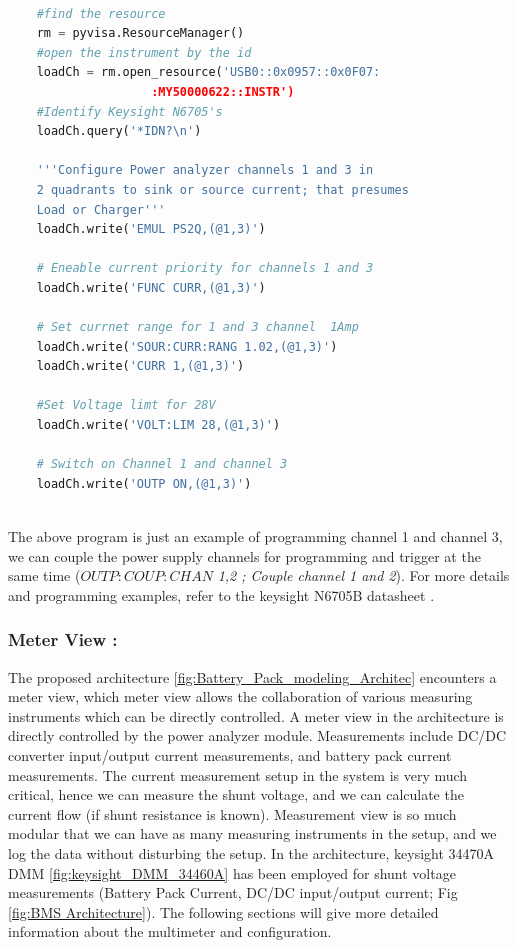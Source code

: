 \begin{lstlisting}[language=Python, caption=Load/Charger Configuration for Keysight N6705's]

    #find the resource
    rm = pyvisa.ResourceManager()
    #open the instrument by the id 
    loadCh = rm.open_resource('USB0::0x0957::0x0F07:
                    :MY50000622::INSTR')
    #Identify Keysight N6705's
    loadCh.query('*IDN?\n')
    
    '''Configure Power analyzer channels 1 and 3 in 
    2 quadrants to sink or source current; that presumes 
    Load or Charger'''
    loadCh.write('EMUL PS2Q,(@1,3)')

    # Eneable current priority for channels 1 and 3
    loadCh.write('FUNC CURR,(@1,3)')
    
    # Set currnet range for 1 and 3 channel  1Amp
    loadCh.write('SOUR:CURR:RANG 1.02,(@1,3)')
    loadCh.write('CURR 1,(@1,3)')
    
    #Set Voltage limt for 28V
    loadCh.write('VOLT:LIM 28,(@1,3)')

    # Switch on Channel 1 and channel 3
    loadCh.write('OUTP ON,(@1,3)')
    
\end{lstlisting}

The above program is just an example of programming channel 1 and channel 3, we can couple the power supply channels for programming and trigger at the same time ($OUTP:COUP:CHAN$ \textit{1,2 ; Couple channel 1 and 2}). For more details and programming examples, refer to the keysight N6705B datasheet \cite{Keysight_N6705_DC_Power_Analyzer}.

\subsubsection{Meter View :}
The proposed architecture \ref{fig:Battery_Pack_modeling_Architec} encounters a meter view, which meter view allows the collaboration of various measuring instruments which can be directly controlled. A meter view in the architecture is directly controlled by the power analyzer module. Measurements include DC/DC converter input/output current measurements, and battery pack current measurements. The current measurement setup in the system is very much critical, hence we can measure the shunt voltage, and we can calculate the current flow (if shunt resistance is known). Measurement view is so much modular that we can have as many measuring instruments in the setup, and we log the data without disturbing the setup.
In the architecture, keysight 34470A DMM  \ref{fig:keysight_DMM_34460A} has been employed for shunt voltage measurements (Battery Pack Current, DC/DC input/output current; Fig \ref{fig:BMS Architecture}). The following sections will give more detailed information about the multimeter and configuration.

